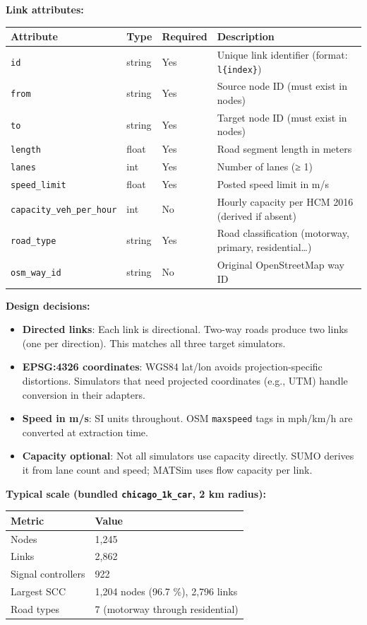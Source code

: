 \textbf{Link attributes:}

\begin{longtable}[]{@{}llll@{}}
\toprule\noalign{}
Attribute & Type & Required & Description \\
\midrule\noalign{}
\endhead
\bottomrule\noalign{}
\endlastfoot
\texttt{id} & string & Yes & Unique link identifier (format:
\texttt{l\{index\}}) \\
\texttt{from} & string & Yes & Source node ID (must exist in nodes) \\
\texttt{to} & string & Yes & Target node ID (must exist in nodes) \\
\texttt{length} & float & Yes & Road segment length in meters \\
\texttt{lanes} & int & Yes & Number of lanes (≥ 1) \\
\texttt{speed\_limit} & float & Yes & Posted speed limit in m/s \\
\texttt{capacity\_veh\_per\_hour} & int & No & Hourly capacity per HCM
2016 (derived if absent) \\
\texttt{road\_type} & string & Yes & Road classification (motorway,
primary, residential\ldots) \\
\texttt{osm\_way\_id} & string & No & Original OpenStreetMap way ID \\
\end{longtable}

\textbf{Design decisions:}

\begin{itemize}
\tightlist
\item
  \textbf{Directed links}: Each link is directional. Two-way roads
  produce two links (one per direction). This matches all three target
  simulators.
\item
  \textbf{EPSG:4326 coordinates}: WGS84 lat/lon avoids
  projection-specific distortions. Simulators that need projected
  coordinates (e.g., UTM) handle conversion in their adapters.
\item
  \textbf{Speed in m/s}: SI units throughout. OSM \texttt{maxspeed} tags
  in mph/km/h are converted at extraction time.
\item
  \textbf{Capacity optional}: Not all simulators use capacity directly.
  SUMO derives it from lane count and speed; MATSim uses flow capacity
  per link.
\end{itemize}

\textbf{Typical scale (bundled \texttt{chicago\_1k\_car}, 2 km radius):}

\begin{longtable}[]{@{}ll@{}}
\toprule\noalign{}
Metric & Value \\
\midrule\noalign{}
\endhead
\bottomrule\noalign{}
\endlastfoot
Nodes & 1,245 \\
Links & 2,862 \\
Signal controllers & 922 \\
Largest SCC & 1,204 nodes (96.7 \%), 2,796 links \\
Road types & 7 (motorway through residential) \\
\end{longtable}

